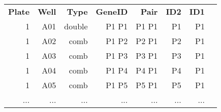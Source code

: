 \begin{tabular}{rrrrrrrr}
\textbf{Plate}&\textbf{Well}&\textbf{Type}&\textbf{GeneID}&\textbf{Pair}&\textbf{ID2}&\textbf{ID1}\\
1&A01&double&P1 P1&P1 P1&P1&P1\\
1&A02&comb&P1 P2&P2 P1&P2&P1\\
1&A03&comb&P1 P3&P3 P1&P3&P1\\
1&A04&comb&P1 P4&P4 P1&P4&P1\\
1&A05&comb&P1 P5&P5 P1&P5&P1\\
...&...&...&...&...&...&...\\
\end{tabular}

